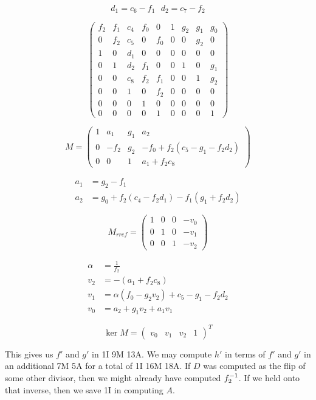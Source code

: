 \[ d_1 = c_6 - f_1 ~~~ d_2 = c_7 - f_2 \]

\[ \left( \begin{array}{rrrrr|rrrrr}
  f_2 & f_1 & c_4 & f_0 &   0 & 1 & g_2 & g_1 & g_0 \\
    0 & f_2 & c_5 &   0 & f_0 & 0 &   0 & g_2 &   0 \\
    1 &   0 & d_1 &   0 &   0 & 0 &   0 &   0 &   0 \\
    0 &   1 & d_2 & f_1 &   0 & 0 &   1 &   0 & g_1 \\
    0 &   0 & c_8 & f_2 & f_1 & 0 &   0 &   1 & g_2 \\
    0 &   0 &   1 &   0 & f_2 & 0 &   0 &   0 &   0 \\
    0 &   0 &   0 &   1 &   0 & 0 &   0 &   0 &   0 \\
    0 &   0 &   0 &   0 &   1 & 0 &   0 &   0 &   1
\end{array} \right) \]

\[ M = \begin{pmatrix}
  1 &   a_1 & g_1 & a_2 \\
  0 & - f_2 & g_2 & - f_0 + f_2(c_5 - g_1 - f_2d_2) \\
  0 &     0 &   1 & a_1 + f_2c_8
\end{pmatrix} \]

\begin{align*}
  a_1 &= g_2 - f_1 \\
  a_2 &= g_0 + f_2(c_4 - f_2d_1) - f_1(g_1 + f_2d_2)
\end{align*}

\[ M_{rref} = \begin{pmatrix}
  1 & 0 & 0 & -v_0 \\
  0 & 1 & 0 & -v_1 \\
  0 & 0 & 1 & -v_2
\end{pmatrix} \]

\begin{align*}
  \alpha &= \frac 1 {f_2} \\
  v_2 &= -(a_1 + f_2c_8) \\
  v_1 &= \alpha(f_0 - g_2v_2) + c_5 - g_1 - f_2d_2 \\
  v_0 &= a_2 + g_1v_2 + a_1v_1
\end{align*}

\[ \ker M = \begin{pmatrix} v_0 & v_1 & v_2 & 1 \end{pmatrix}^T \]

This gives us $f'$ and $g'$ in 1I 9M 13A.
We may compute $h'$ in terms of $f'$ and $g'$ in an additional 7M 5A
for a total of 1I 16M 18A.
If $D$ was computed as the flip of some other divisor,
then we might already have computed $f_2^{-1}$.
If we held onto that inverse, then we save 1I in computing $A$.
